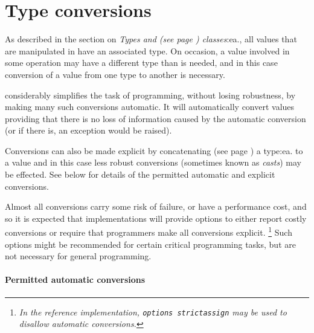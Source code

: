 \chapter{Type conversions}\label{refconv}
 
As described in the section on  \emph{Types and (see page \pageref{reftypes}) 
classes}:ea., all values that are manipulated in \nr{} have an
associated type.  On occasion, a value involved in some operation may
have a different type than is needed, and in this case conversion of
a value from one type to another is necessary.
 
\nr{} considerably simplifies the task of programming, without losing
robustness, by making many such conversions automatic.  It will
automatically convert values providing that there is no loss of
information caused by the automatic conversion (or if there is, an
exception would be raised).
 
\index{,}
Conversions can also be made explicit by  concatenating (see page \pageref{reftypeops}) 
a type:ea. to a value and in this case less robust conversions
(sometimes known as \emph{casts}) may be effected.
See below for details of the permitted automatic and explicit
conversions.
 
Almost all conversions carry some risk of failure, or have a performance
cost, and so it is expected that implementations will provide options to
either report costly conversions or require that programmers make all
conversions explicit.
\footnote{
\emph{In the reference implementation, \texttt{options strictassign} may be
used to disallow automatic conversions.}
}
Such options might be recommended for certain critical programming
tasks, but are not necessary for general programming.
\subsubsection{Permitted automatic conversions}
 
